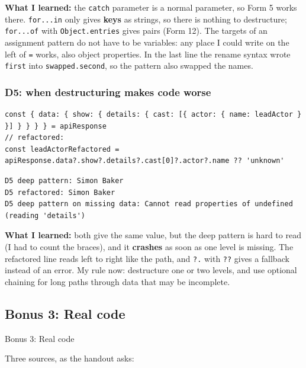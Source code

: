 \documentclass[
  10pt,
]{article}
\newcommand{\passthrough}[1]{#1}
\begin{document}
\textbf{What I learned:} the \passthrough{\lstinline!catch!} parameter
is a normal parameter, so Form 5 works there.
\passthrough{\lstinline!for...in!} only gives \textbf{keys} as strings,
so there is nothing to destructure; \passthrough{\lstinline!for...of!}
with \passthrough{\lstinline!Object.entries!} gives pairs (Form 12). The
targets of an assignment pattern do not have to be variables: any place
I could write on the left of \passthrough{\lstinline!=!} works, also
object properties. In the last line the rename syntax wrote
\passthrough{\lstinline!first!} into
\passthrough{\lstinline!swapped.second!}, so the pattern also swapped
the names.

\hypertarget{d5-when-destructuring-makes-code-worse}{%
\subsubsection{D5: when destructuring makes code
worse}\label{d5-when-destructuring-makes-code-worse}}

\begin{lstlisting}
const { data: { show: { details: { cast: [{ actor: { name: leadActor } }] } } } } = apiResponse
// refactored:
const leadActorRefactored = apiResponse.data?.show?.details?.cast[0]?.actor?.name ?? 'unknown'
\end{lstlisting}

\begin{lstlisting}
D5 deep pattern: Simon Baker
D5 refactored: Simon Baker
D5 deep pattern on missing data: Cannot read properties of undefined (reading 'details')
\end{lstlisting}

\textbf{What I learned:} both give the same value, but the deep pattern
is hard to read (I had to count the braces), and it \textbf{crashes} as
soon as one level is missing. The refactored line reads left to right
like the path, and \passthrough{\lstinline!?.!} with
\passthrough{\lstinline!??!} gives a fallback instead of an error. My
rule now: destructure one or two levels, and use optional chaining for
long paths through data that may be incomplete.

\hypertarget{bonus-3-real-code}{%
\subsection{Bonus 3: Real code}\label{bonus-3-real-code}}

Bonus 3: Real code

Three sources, as the handout asks:
\end{document}
